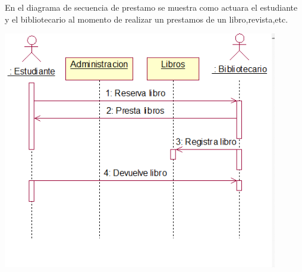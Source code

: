 \begin{enumerate}[1.]
	   En el diagrama de secuencia de prestamo se muestra como actuara el estudiante y el bibliotecario al momento de realizar un prestamos de un libro,revista,etc.
	\begin{center}
	\includegraphics[width=12cm]{./Imagenes/img3} 
	\end{center}
	

\end{enumerate}
